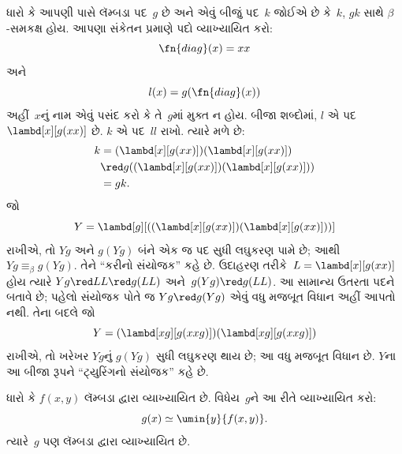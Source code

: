 ધારો કે આપણી પાસે લૅમ્બડા પદ~$g$ છે અને એવું બીજું પદ~$k$ જોઈએ છે
કે~$k$, $gk$ સાથે $\beta$-સમકક્ષ હોય. આપણા સંકેતન પ્રમાણે પદો
વ્યાખ્યાયિત કરો:
\[
\fn{diag}(x) = xx
\]
અને
\[
l(x) = g(\fn{diag}(x))
\]
અહીં~$x$નું નામ એવું પસંદ કરો કે તે~$g$માં મુક્ત ન હોય.
બીજા શબ્દોમાં, $l$ એ પદ~$\lambd[x][g(xx)]$ છે. $k$ એ પદ~$ll$
રાખો. ત્યારે મળે છે:
\begin{align*}
k & = (\lambd[x][g(xx)])(\lambd[x][g(xx)]) \\
& \red  g((\lambd[x][g(xx)])(\lambd[x][g(xx)])) \\
& = gk.
\end{align*}
જો
\[
Y = \lambd[g][((\lambd[x][g(xx)])(\lambd[x][g(xx)]))]
\]
રાખીએ, તો $Yg$ અને $g(Yg)$ બંને એક જ પદ સુધી લઘુકરણ પામે છે;
આથી $Yg \equiv_\beta g(Yg)$. તેને ``કરીનો સંયોજક'' કહે છે.
ઉદાહરણ તરીકે~$L=\lambd[x][g(xx)]$ હોય ત્યારે
$Yg\red LL\red g(LL)$ અને~$g(Yg)\red g(LL)$.
આ સામાન્ય ઉતરતા પદને બતાવે છે; પહેલો સંયોજક પોતે જ
$Yg\red g(Yg)$ એવું વધુ મજબૂત વિધાન અહીં આપતો નથી. તેના
બદલે જો
\[
Y = (\lambd[xg][g(xxg)])(\lambd[xg][g(xxg)])
\]
રાખીએ, તો ખરેખર $Yg$નું $g(Yg)$ સુધી લઘુકરણ થાય છે; આ વધુ
મજબૂત વિધાન છે. $Y$ના આ બીજા રૂપને ``ટ્યુરિંગનો સંયોજક'' કહે છે.
\endgroup


\begingroup
\makeatletter{}\makeatother

\label{guunit:OLP-0355}


\begin{lem}
ધારો કે $f(x,y)$ લૅમ્બડા દ્વારા વ્યાખ્યાયિત છે. વિધેય~$g$ને
આ રીતે વ્યાખ્યાયિત કરો:
\[
g(x) \simeq \umin{y}{f(x,y)}.
\]
ત્યારે~$g$ પણ લૅમ્બડા દ્વારા વ્યાખ્યાયિત છે.
\end{lem}

